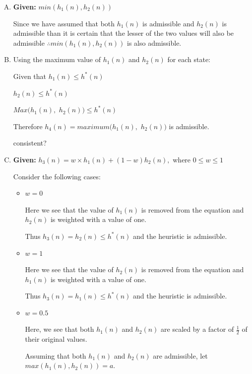 \documentclass[10pt,a4paper]{article}
\begin{document}
	\begin{enumerate}[A.]
		\item \textbf{Given:} $min(h_1(n), h_2(n))$
		
		Since we have assumed that both $h_1(n)$ is admissible and $h_2(n)$ is admissible than it is certain that the lesser of the two values will also be admissible $\therefore min(h_1(n), h_2(n))$ is also admissible.
		
		
		\item
		Using the maximum value of $h_1(n)$ and $h_2(n)$ for each state:
		
			
		Given that $h_1(n) \leq h^*(n)$
		
		$h_2(n) \leq h^*(n)$
		
		$Max(h_1(n),$ $h_2(n)) \leq h^*(n)$
		
		Therefore $h_4(n) = maximum(h_1(n),$ $h_2(n))$ is admissible.
		
		consistent? 
			
		
		
		\item \textbf{Given:} $h_3(n) = w \times h_1(n) + (1-w)h_2(n),$ where $0 \leq w \leq 1$
		
		Consider the following cases:
		
		\begin{itemize}
			\item
			
			$w = 0$ 
			
			Here we see that the value of $h_1(n)$ is removed from the equation and $h_2(n)$ is weighted with a value of one.
			
			Thus $h_3(n) = h_2(n) \leq h^*(n)$ and the heuristic is admissible.
			
			\item
			
			$w = 1$
			
			Here we see that the value of $h_2(n)$ is removed from the equation and $h_1(n)$ is weighted with a value of one.
			
			Thus $h_3(n) = h_1(n) \leq h^*(n)$ and the heuristic is admissible.
			
			\item
			
			$w = 0.5$
			
			Here, we see that both $h_1(n)$ and $h_2(n)$ are scaled by a factor of $\frac{1}{2}$ of their original values.
			
			Assuming that both $h_1(n)$ and $h_2(n)$ are admissible, let $max(h_1(n), h_2(n)) = a$.
			

\end{itemize}
\end{enumerate}
\end{document}
